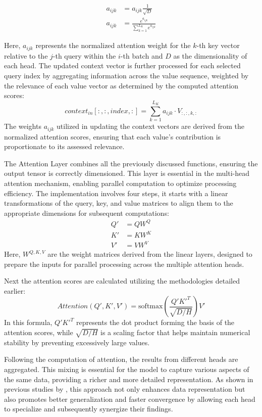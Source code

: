 \documentclass{article}
\begin{document}
\begin{align}
    a_{ijk} &= a_{ijk} \frac{1}{\sqrt{D}} \\
    a_{ijk} &= \frac{e^{a_{ijk}}}{\sum^{L_K}_{k=1}e^{a_{ijk}}}
\end{align}

Here, $a_{ijk}$ represents the normalized attention weight for the $k$-th key vector relative to the $j$-th query within the $i$-th batch and $D$ as the dimensionality of each head. The updated context vector is further processed for each selected query index by aggregating information across the value sequence, weighted by the relevance of each value vector as determined by the computed attention scores:
\begin{equation}
    context_{in}[:,:,index,:] = \sum^{L_K}_{k=1} a_{ijk} \cdot V_{:,:,k,:}
\end{equation}
The weights $a_{ijk}$ utilized in updating the context vectors are derived from the normalized attention scores, ensuring that each value's contribution is proportionate to its assessed relevance.

The Attention Layer combines all the previously discussed functions, ensuring the output tensor is correctly dimensioned. This layer is essential in the multi-head attention mechanism, enabling parallel computation to optimize processing efficiency. The implementation involves four steps, it starts with a linear transformations of the query, key, and value matrices to align them to the appropriate dimensions for subsequent computations:
\begin{align}
    Q' &= QW^Q \\
    K' &= KW^K \\
    V' &= VW^V
\end{align}
Here, $W^{Q, K, V}$ are the weight matrices derived from the linear layers, designed to prepare the inputs for parallel processing across the multiple attention heads.

Next the attention scores are calculated utilizing the methodologies detailed earlier:
\begin{equation}\label{eq:Encoder-Attention}
    Attention(Q', K', V') = \text{softmax} \left( \frac{Q'K'^T}{\sqrt{D / H}} \right) V'
\end{equation}
In this formula, $Q'K'^T$ represents the dot product forming the basis of the attention scores, while $\sqrt{D / H}$ is a scaling factor that helps maintain numerical stability by preventing excessively large values.

Following the computation of attention, the results from different heads are aggregated. This mixing is essential for the model to capture various aspects of the same data, providing a richer and more detailed representation. As shown in previous studies by \cite{multi-head-mixing, mulit-head-mixing2}, this approach not only enhances data representation but also promotes better generalization and faster convergence by allowing each head to specialize and subsequently synergize their findings.
\end{document}
